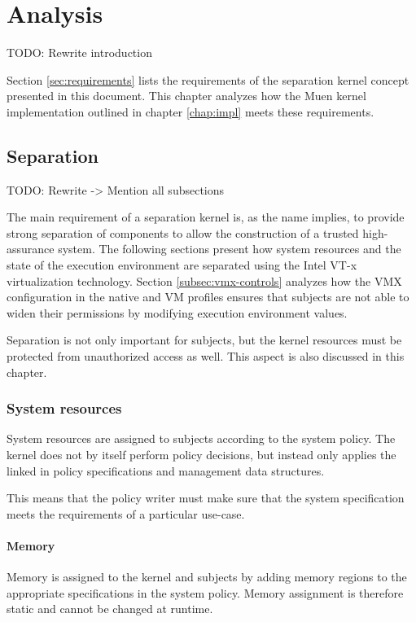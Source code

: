 \chapter{Analysis}
TODO: Rewrite introduction

Section \ref{sec:requirements} lists the requirements of the separation kernel
concept presented in this document. This chapter analyzes how the Muen kernel
implementation outlined in chapter \ref{chap:impl} meets these requirements.

\section{Separation}
TODO: Rewrite -> Mention all subsections

The main requirement of a separation kernel is, as the name implies, to provide
strong separation of components to allow the construction of a trusted
high-assurance system. The following sections present how system resources and
the state of the execution environment are separated using the Intel VT-x
virtualization technology. Section \ref{subsec:vmx-controls} analyzes how the
VMX configuration in the native and VM profiles ensures that subjects are not
able to widen their permissions by modifying execution environment values.

Separation is not only important for subjects, but the kernel resources must be
protected from unauthorized access as well. This aspect is also discussed in
this chapter.

\subsection{System resources}
System resources are assigned to subjects according to the system policy. The
kernel does not by itself perform policy decisions, but instead only applies
the linked in policy specifications and management data structures.

This means that the policy writer must make sure that the system specification
meets the requirements of a particular use-case.

\subsubsection{Memory}
Memory is assigned to the kernel and subjects by adding memory regions to the
appropriate specifications in the system policy. Memory assignment is therefore
static and cannot be changed at runtime.

